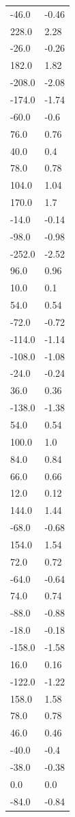 \begin{longtable}{ll}
-46.0 & -0.46 \\
228.0 & 2.28 \\
-26.0 & -0.26 \\
182.0 & 1.82 \\
-208.0 & -2.08 \\
-174.0 & -1.74 \\
-60.0 & -0.6 \\
76.0 & 0.76 \\
40.0 & 0.4 \\
78.0 & 0.78 \\
104.0 & 1.04 \\
170.0 & 1.7 \\
-14.0 & -0.14 \\
-98.0 & -0.98 \\
-252.0 & -2.52 \\
96.0 & 0.96 \\
10.0 & 0.1 \\
54.0 & 0.54 \\
-72.0 & -0.72 \\
-114.0 & -1.14 \\
-108.0 & -1.08 \\
-24.0 & -0.24 \\
36.0 & 0.36 \\
-138.0 & -1.38 \\
54.0 & 0.54 \\
100.0 & 1.0 \\
84.0 & 0.84 \\
66.0 & 0.66 \\
12.0 & 0.12 \\
144.0 & 1.44 \\
-68.0 & -0.68 \\
154.0 & 1.54 \\
72.0 & 0.72 \\
-64.0 & -0.64 \\
74.0 & 0.74 \\
-88.0 & -0.88 \\
-18.0 & -0.18 \\
-158.0 & -1.58 \\
16.0 & 0.16 \\
-122.0 & -1.22 \\
158.0 & 1.58 \\
78.0 & 0.78 \\
46.0 & 0.46 \\
-40.0 & -0.4 \\
-38.0 & -0.38 \\
0.0 & 0.0 \\
-84.0 & -0.84 \\

\end{longtable}
